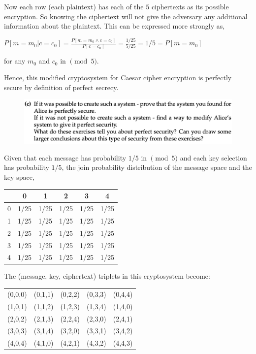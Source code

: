 \documentclass{ashoka-crypto}
\begin{document}
Now each row (each plaintext) has each of the $5$ ciphertexts as its possible encryption. So knowing the ciphertext will not give the adversary any additional information about the plaintext. This can be expressed more strongly as,

\begin{math}
P[m = m_0 | c = c_0] = \frac{P[m = m_0 \land c = c_0]}{P[c = c_0]} = \frac{1/25}{5/25} = 1/5 = P[m = m_0]
\end{math}

for any $m_0$ and $c_0$ in $\pmod 5$.

Hence, this modified cryptosystem for Caesar cipher encryption is perfectly secure by definition of perfect secrecy.

\begin{figure}[h]
\includegraphics[width=17cm]{5c}
\end{figure}

Given that each message has probability $1/5$ in $\pmod 5$ and each key selection has probability $1/5$, the join probability distribution of the message space and the key space, 

\begin{table}[h]
\begin{tabular}{|c|ccccc|}
\hline
  & 0    & 1    & 2 & 3 & 4   \\
  \hline
0 & 1/25  & 1/25  & 1/25 & 1/25 & 1/25  \\
1 & 1/25  & 1/25  & 1/25 & 1/25 & 1/25  \\
2 & 1/25  & 1/25  & 1/25 & 1/25 & 1/25 \\
3 & 1/25  & 1/25  & 1/25 & 1/25 & 1/25 \\
4 & 1/25  & 1/25  & 1/25 & 1/25 & 1/25 \\
\hline
\end{tabular}
\centering
\end{table}

The (message, key, ciphertext) triplets in this cryptosystem become:

\begin{table}[h]
\begin{tabular}{ccccc}
(0,0,0)  & (0,1,1)  & (0,2,2) & (0,3,3) & (0,4,4)  \\
(1,0,1) & (1,1,2)  & (1,2,3) & (1,3,4) & (1,4,0)  \\
(2,0,2) & (2,1,3) & (2,2,4) & (2,3,0) & (2,4,1) \\
(3,0,3) & (3,1,4) & (3,2,0) & (3,3,1) & (3,4,2) \\
(4,0,4) & (4,1,0) & (4,2,1) & (4,3,2) & (4,4,3) \\
\end{tabular}
\centering
\end{table}
\end{document}
